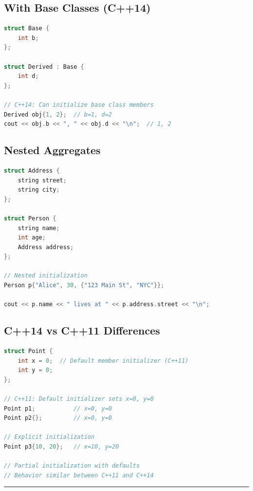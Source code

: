 \hypertarget{with-base-classes-c14}{%
\subsection{With Base Classes (C++14)}\label{with-base-classes-c14}}

\begin{lstlisting}[language={C++}]
struct Base {
    int b;
};

struct Derived : Base {
    int d;
};

// C++14: Can initialize base class members
Derived obj{1, 2};  // b=1, d=2
cout << obj.b << ", " << obj.d << "\n";  // 1, 2
\end{lstlisting}

\hypertarget{nested-aggregates}{%
\subsection{Nested Aggregates}\label{nested-aggregates}}

\begin{lstlisting}[language={C++}]
struct Address {
    string street;
    string city;
};

struct Person {
    string name;
    int age;
    Address address;
};

// Nested initialization
Person p{"Alice", 30, {"123 Main St", "NYC"}};

cout << p.name << " lives at " << p.address.street << "\n";
\end{lstlisting}

\hypertarget{c14-vs-c11-differences}{%
\subsection{C++14 vs C++11 Differences}\label{c14-vs-c11-differences}}

\begin{lstlisting}[language={C++}]
struct Point {
    int x = 0;  // Default member initializer (C++11)
    int y = 0;
};

// C++11: Default initializer sets x=0, y=0
Point p1;           // x=0, y=0
Point p2{};         // x=0, y=0

// Explicit initialization
Point p3{10, 20};   // x=10, y=20

// Partial initialization with defaults
// Behavior similar between C++11 and C++14
\end{lstlisting}

\begin{center}\rule{0.5\linewidth}{0.5pt}\end{center}

